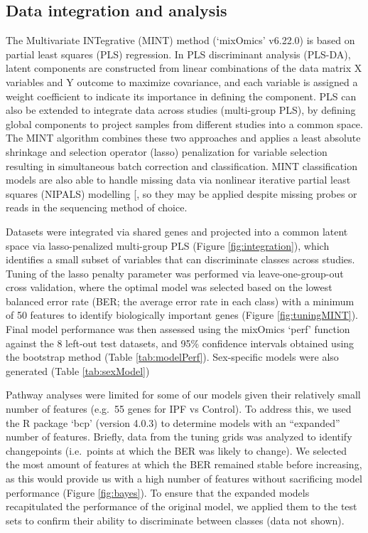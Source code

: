 \documentclass[
]{article}
\begin{document}
\subsection{Data integration and analysis}\label{data}

The Multivariate INTegrative (MINT) method (`mixOmics' v6.22.0) is based on partial least squares (PLS) regression. In PLS discriminant analysis (PLS-DA), latent components are constructed from linear combinations of the data matrix X variables and Y outcome to maximize covariance, and each variable is assigned a weight coefficient to indicate its importance in defining the component. PLS can also be extended to integrate data across studies (multi-group PLS), by defining global components to project samples from different studies into a common space. The MINT algorithm combines these two approaches and applies a least absolute shrinkage and selection operator (lasso) penalization for variable selection resulting in simultaneous batch correction and classification. MINT classification models are also able to handle missing data via nonlinear iterative partial least squares (NIPALS) modelling {[}\citeproc{ref-wold_nonlinear_1973}{157}{]}, so they may be applied despite missing probes or reads in the sequencing method of choice.

Datasets were integrated via shared genes and projected into a common latent space via lasso-penalized multi-group PLS (Figure \ref{fig:integration}), which identifies a small subset of variables that can discriminate classes across studies. Tuning of the lasso penalty parameter was performed via leave-one-group-out cross validation, where the optimal model was selected based on the lowest balanced error rate (BER; the average error rate in each class) with a minimum of 50 features to identify biologically important genes (Figure \ref{fig:tuningMINT}). Final model performance was then assessed using the mixOmics `perf' function against the 8 left-out test datasets, and 95\% confidence intervals obtained using the bootstrap method (Table \ref{tab:modelPerf}). Sex-specific models were also generated (Table \ref{tab:sexModel})

Pathway analyses were limited for some of our models given their relatively small number of features (e.g.~55 genes for IPF vs Control). To address this, we used the R package `bcp' (version 4.0.3) to determine models with an ``expanded'' number of features. Briefly, data from the tuning grids was analyzed to identify changepoints (i.e.~points at which the BER was likely to change). We selected the most amount of features at which the BER remained stable before increasing, as this would provide us with a high number of features without sacrificing model performance (Figure \ref{fig:bayes}). To ensure that the expanded models recapitulated the performance of the original model, we applied them to the test sets to confirm their ability to discriminate between classes (data not shown).
\end{document}

